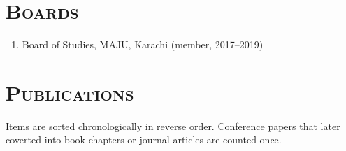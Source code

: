 \documentclass[a4paper, 10pt]{article}
\begin{document}
\section*{\normalfont\textsc{Boards}}
\begin{enumerate}
\itemsep-4pt 
\item Board of Studies, MAJU, Karachi (member, 2017--2019)
\end{enumerate}

\section*{\normalfont\textsc{Publications}}
\vspace{-1em}Items are sorted chronologically in reverse order. Conference papers that later coverted into book chapters or journal articles are counted once.
\end{document}
